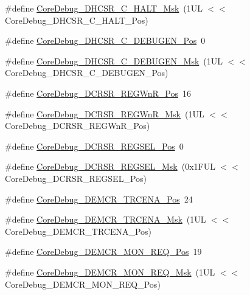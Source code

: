 \begin{DoxyCompactItemize}
\item 
\#define \hyperlink{group__CMSIS__CoreDebug_ga1d905a3aa594eb2e8bb78bcc4da05b3f}{Core\-Debug\-\_\-\-D\-H\-C\-S\-R\-\_\-\-C\-\_\-\-H\-A\-L\-T\-\_\-\-Msk}~(1\-U\-L $<$$<$ Core\-Debug\-\_\-\-D\-H\-C\-S\-R\-\_\-\-C\-\_\-\-H\-A\-L\-T\-\_\-\-Pos)
\item 
\#define \hyperlink{group__CMSIS__CoreDebug_gab557abb5b172b74d2cf44efb9d824e4e}{Core\-Debug\-\_\-\-D\-H\-C\-S\-R\-\_\-\-C\-\_\-\-D\-E\-B\-U\-G\-E\-N\-\_\-\-Pos}~0
\item 
\#define \hyperlink{group__CMSIS__CoreDebug_gab815c741a4fc2a61988cd2fb7594210b}{Core\-Debug\-\_\-\-D\-H\-C\-S\-R\-\_\-\-C\-\_\-\-D\-E\-B\-U\-G\-E\-N\-\_\-\-Msk}~(1\-U\-L $<$$<$ Core\-Debug\-\_\-\-D\-H\-C\-S\-R\-\_\-\-C\-\_\-\-D\-E\-B\-U\-G\-E\-N\-\_\-\-Pos)
\item 
\#define \hyperlink{group__CMSIS__CoreDebug_ga51e75942fc0614bc9bb2c0e96fcdda9a}{Core\-Debug\-\_\-\-D\-C\-R\-S\-R\-\_\-\-R\-E\-G\-Wn\-R\-\_\-\-Pos}~16
\item 
\#define \hyperlink{group__CMSIS__CoreDebug_ga1eef4992d8f84bc6c0dffed1c87f90a5}{Core\-Debug\-\_\-\-D\-C\-R\-S\-R\-\_\-\-R\-E\-G\-Wn\-R\-\_\-\-Msk}~(1\-U\-L $<$$<$ Core\-Debug\-\_\-\-D\-C\-R\-S\-R\-\_\-\-R\-E\-G\-Wn\-R\-\_\-\-Pos)
\item 
\#define \hyperlink{group__CMSIS__CoreDebug_ga52182c8a9f63a52470244c0bc2064f7b}{Core\-Debug\-\_\-\-D\-C\-R\-S\-R\-\_\-\-R\-E\-G\-S\-E\-L\-\_\-\-Pos}~0
\item 
\#define \hyperlink{group__CMSIS__CoreDebug_ga17cafbd72b55030219ce5609baa7c01d}{Core\-Debug\-\_\-\-D\-C\-R\-S\-R\-\_\-\-R\-E\-G\-S\-E\-L\-\_\-\-Msk}~(0x1\-F\-U\-L $<$$<$ Core\-Debug\-\_\-\-D\-C\-R\-S\-R\-\_\-\-R\-E\-G\-S\-E\-L\-\_\-\-Pos)
\item 
\#define \hyperlink{group__CMSIS__CoreDebug_ga6ff2102b98f86540224819a1b767ba39}{Core\-Debug\-\_\-\-D\-E\-M\-C\-R\-\_\-\-T\-R\-C\-E\-N\-A\-\_\-\-Pos}~24
\item 
\#define \hyperlink{group__CMSIS__CoreDebug_ga5e99652c1df93b441257389f49407834}{Core\-Debug\-\_\-\-D\-E\-M\-C\-R\-\_\-\-T\-R\-C\-E\-N\-A\-\_\-\-Msk}~(1\-U\-L $<$$<$ Core\-Debug\-\_\-\-D\-E\-M\-C\-R\-\_\-\-T\-R\-C\-E\-N\-A\-\_\-\-Pos)
\item 
\#define \hyperlink{group__CMSIS__CoreDebug_ga341020a3b7450416d72544eaf8e57a64}{Core\-Debug\-\_\-\-D\-E\-M\-C\-R\-\_\-\-M\-O\-N\-\_\-\-R\-E\-Q\-\_\-\-Pos}~19
\item 
\#define \hyperlink{group__CMSIS__CoreDebug_gae6384cbe8045051186d13ef9cdeace95}{Core\-Debug\-\_\-\-D\-E\-M\-C\-R\-\_\-\-M\-O\-N\-\_\-\-R\-E\-Q\-\_\-\-Msk}~(1\-U\-L $<$$<$ Core\-Debug\-\_\-\-D\-E\-M\-C\-R\-\_\-\-M\-O\-N\-\_\-\-R\-E\-Q\-\_\-\-Pos)

\end{DoxyCompactItemize}
